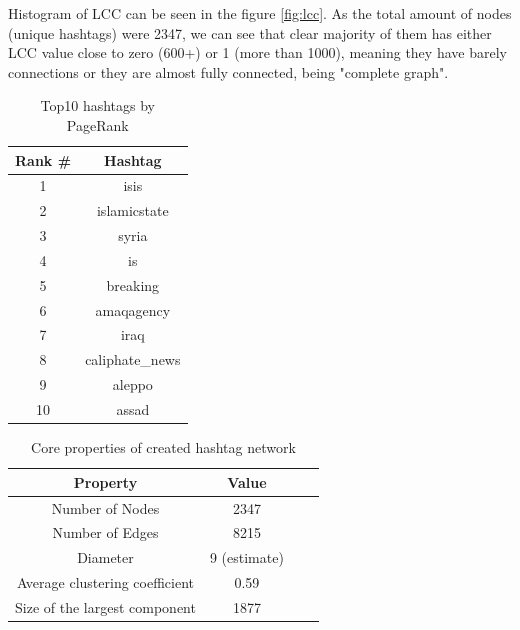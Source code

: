 \documentclass[conference]{IEEEtran}
\begin{document}
Histogram of LCC can be seen in the figure \ref{fig:lcc}.
As the total amount of nodes (unique hashtags) were 2347, we can see that clear majority of them has either LCC value close to zero (600+) or 1 (more than 1000), meaning
they have barely connections or they are almost fully connected, being "complete graph".


\begin{table}
    \begin{tabular}{ |c|c|}
        \hline
        Rank # & Hashtag \\
        \hline
        1 & isis \\
        \hline
        2 & islamicstate \\
        \hline
        3 & syria \\
        \hline
        4 & is \\
        \hline
        5 & breaking \\
        \hline
        6 & amaqagency \\
        \hline
        7 & iraq \\
        \hline
        8 & caliphate\_news \\
        \hline
        9 & aleppo \\
        \hline
        10 & assad \\
        \hline
    \end{tabular}
    \caption{Top10 hashtags by PageRank}
    \label{tab:hashtag-names}
\end{table}

\begin{table}
    \begin{tabular}{ |c|c|c|c|}
        \hline
        Property & Value \\
        \hline
        Number of Nodes & 2347 \\
        \hline
        Number of Edges & 8215 \\
        \hline
        Diameter & 9 (estimate) \\
        \hline
        Average clustering coefficient & 0.59 \\
        \hline
        Size of the largest component & 1877 \\
        \hline
    \end{tabular}
    \caption{Core properties of created hashtag network}
    \label{tab:hashtag-network}
\end{table}
\end{document}

